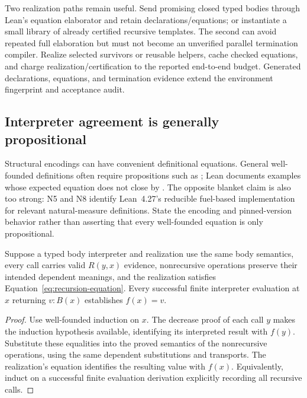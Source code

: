 Two realization paths remain useful. Send promising closed typed bodies
through Lean's equation elaborator and retain declarations/equations; or
instantiate a small library of already certified recursive templates. The
second can avoid repeated full elaboration but must not become an unverified
parallel termination compiler. Realize selected survivors or reusable helpers,
cache checked equations, and charge realization/certification to the reported
end-to-end budget. Generated declarations, equations, and termination evidence
extend the environment fingerprint and acceptance audit.

\subsection{Interpreter agreement is generally propositional}\label{sec:recursion-simulation}

Structural encodings can have convenient definitional equations. General
well-founded definitions often require propositions such as
; Lean documents examples whose expected equation
does not close by . The opposite blanket claim is also too strong:
N5 and N8 identify Lean~4.27's reducible fuel-based implementation for relevant
natural-measure definitions. State the encoding and pinned-version behavior
rather than asserting that every well-founded equation is only propositional.
\cite{leanrecursion,lean427}

\begin{proposition}\label{prop:recursion-simulation}
Suppose a typed body interpreter and realization use the same body semantics,
every call carries valid $R(y,x)$ evidence, nonrecursive operations preserve
their intended dependent meanings, and the realization satisfies
Equation~\ref{eq:recursion-equation}. Every successful finite interpreter
evaluation at $x$ returning $v:B(x)$ establishes $f(x)=v$.
\end{proposition}
\begin{proof}
Use well-founded induction on $x$. The decrease proof of each call $y$ makes
the induction hypothesis available, identifying its interpreted result with
$f(y)$. Substitute these equalities into the proved semantics of the
nonrecursive operations, using the same dependent substitutions and transports.
The realization's equation identifies the resulting value with $f(x)$.
Equivalently, induct on a successful finite evaluation derivation explicitly
recording all recursive calls.
\end{proof}


